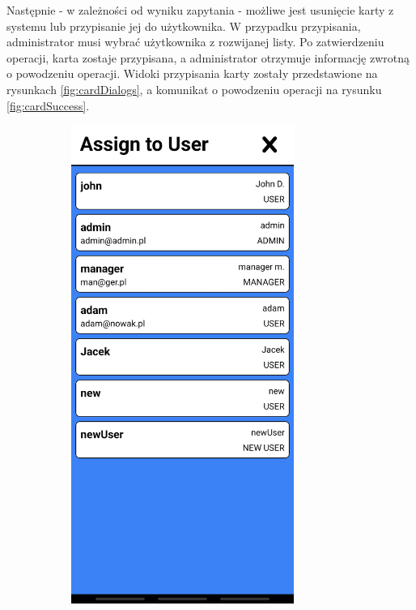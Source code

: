 Następnie - w zależności od wyniku zapytania - możliwe jest usunięcie karty z systemu lub przypisanie jej do użytkownika. W przypadku przypisania, administrator musi wybrać użytkownika z rozwijanej listy. Po zatwierdzeniu operacji, karta zostaje przypisana, a administrator otrzymuje informację zwrotną o powodzeniu operacji. Widoki przypisania karty zostały przedstawione na rysunkach \ref{fig:cardDialogs}, a komunikat o powodzeniu operacji na rysunku \ref{fig:cardSuccess}.

\begin{figure}
    \centering
    \begin{subfigure}[b]{0.3\textwidth}
        \centering
        \includegraphics[width=0.8\textwidth, frame]{graf/mobile/userList.jpg}

\end{subfigure}
\end{figure}
